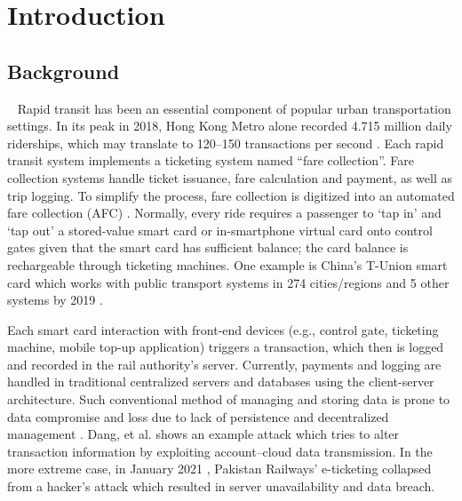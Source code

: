 \documentclass[a4paper,12pt,oneside, utf8x]{report}
\begin{document}
\chapter{Introduction}
\label{cintro}
\section{Background}\
\label{sbriefov}
Rapid transit has been an essential component of popular urban transportation settings. In its peak in 2018, Hong Kong Metro alone recorded 4.715 million daily riderships, which may translate to 120--150 transactions per second \cite{y71}. 
Each rapid transit system implements a ticketing system named ``fare collection''. Fare collection systems handle ticket issuance, fare calculation and payment, as well as trip logging. To simplify the process, fare collection is digitized into an automated fare collection (AFC) \cite{p11}.
Normally, every ride requires a passenger to ‘tap in’ and ‘tap out’ a stored-value smart card or in-smartphone virtual card onto control gates given that the smart card has sufficient balance; the card balance is rechargeable through ticketing machines. One example is China’s T-Union smart card which works with public transport systems in 274 cities/regions and 5 other systems by 2019 \cite{y2}.

Each smart card interaction with front-end devices (e.g., control gate, ticketing machine, mobile top-up application) triggers a transaction, which then is logged and recorded in the rail authority’s server. Currently, payments and logging are handled in traditional centralized servers and databases \cite{p67,p4} using the client-server architecture. Such conventional method of managing and storing data is prone to data compromise and loss due to lack of persistence and decentralized management \cite{y44}. Dang, et al. \cite{a6} shows an example attack which tries to alter transaction information by exploiting account–cloud data transmission. In the more extreme case, in January 2021 \cite{y500}, Pakistan Railways' e-ticketing collapsed from a hacker's attack which resulted in server unavailability and data breach.
\end{document}
